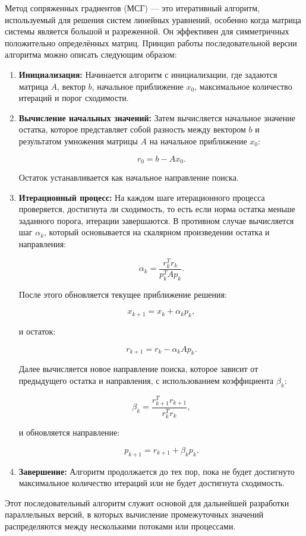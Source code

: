\documentclass[12pt]{article}
\begin{document}
\hspace*{1.35em}Метод сопряженных градиентов (МСГ) — это итеративный алгоритм, используемый для решения систем линейных уравнений, особенно когда матрица системы является большой и разреженной. Он эффективен для симметричных положительно определённых матриц.
Принцип работы последовательной версии алгоритма можно описать следующим образом:
\begin{enumerate}
    \item \textbf{Инициализация:} Начинается алгоритм с инициализации, где задаются матрица $A$, вектор $b$, начальное приближение $x_0$, максимальное количество итераций и порог сходимости.
    \item \textbf{Вычисление начальных значений:} Затем вычисляется начальное значение остатка, которое представляет собой разность между вектором $b$ и результатом умножения матрицы $A$ на начальное приближение $x_0$:

\[
r_0 = b - Ax_0.
\]

Остаток устанавливается как начальное направление поиска.
    \item \textbf{Итерационный процесс:} На каждом шаге итерационного процесса проверяется, достигнута ли сходимость, то есть если норма остатка меньше заданного порога, итерации завершаются. В противном случае вычисляется шаг $\alpha_k$, который основывается на скалярном произведении остатка и направления:

\[
\alpha_k = \frac{r_k^T r_k}{p_k^T A p_k}.
\]

После этого обновляется текущее приближение решения:

\[
x_{k+1} = x_k + \alpha_k p_k,
\]

и остаток:

\[
r_{k+1} = r_k - \alpha_k A p_k.
\]

Далее вычисляется новое направление поиска, которое зависит от предыдущего остатка и направления, с использованием коэффициента $\beta_k$:

\[
\beta_k = \frac{r_{k+1}^T r_{k+1}}{r_k^T r_k},
\]

и обновляется направление:

\[
p_{k+1} = r_{k+1} + \beta_k p_k.
\]
\item \textbf{Завершение:} Алгоритм продолжается до тех пор, пока не будет достигнуто максимальное количество итераций или не будет достигнута сходимость.
    
\end{enumerate}
Этот последовательный алгоритм служит основой для дальнейшей разработки параллельных версий, в которых вычисление промежуточных значений распределяются между несколькими потоками или процессами.
\end{document}
